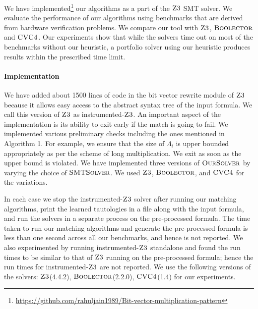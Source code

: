 %
We have implemented\footnote{\url{https://github.com/rahuljain1989/Bit-vector-multiplication-pattern}} our algorithms as a part of the $\textsc{Z3}$ SMT solver.
%
We evaluate the performance of our algorithms using benchmarks that are
derived from hardware verification problems.
%
We compare our tool with $\textsc{Z3}$, $\textsc{Boolector}$ and $\textsc{CVC4}$.
%
Our experiments show that while the solvers time out on most of the
benchmarks without our heuristic, a portfolio solver using our heuristic
produces results within the prescribed time limit.

\paragraph{\bf Implementation}
We have added about 1500 lines of code in the bit vector rewrite module of $\textsc{Z3}$ because it allows easy access to the abstract syntax tree of the input formula. We call this version of $\textsc{Z3}$ as instrumented-$\textsc{Z3}$.
%
An important aspect of the implementation is its ability to exit early if the match is going to fail.
%
We implemented various preliminary checks including the ones mentioned in Algorithm 1. For example, we ensure that the size of $\Lambda_i$ is upper bounded appropriately as per the scheme of long multiplication. We exit as soon as the upper bound is violated. 
%
We have implemented three versions of $\textsc{OurSolver}$ by varying the choice of $\textsc{SMTSolver}$.
%
We used  $\textsc{Z3}$, $\textsc{Boolector}$, and $\textsc{CVC4}$ for the variations. 
%

In each case we stop the instrumented-$\textsc{Z3}$ solver after running our matching algorithms,
print the learned tautologies in a file along with the input formula, and
run the solvers in a separate process on the pre-processed formula. 
The time taken to run our matching algorithms and generate the pre-processed formula is less than one second across all our benchmarks, and hence is not reported. 
We also experimented by running instrumented-$\textsc{Z3}$ standalone and found the run times to be similar to that of $\textsc{Z3}$ running on the pre-processed formula; hence the run times for instrumented-$\textsc{Z3}$ are not reported. We use the following versions of the solvers: $\textsc{Z3}$(4.4.2), $\textsc{Boolector}$(2.2.0), $\textsc{CVC4}$(1.4) for our experiments.

